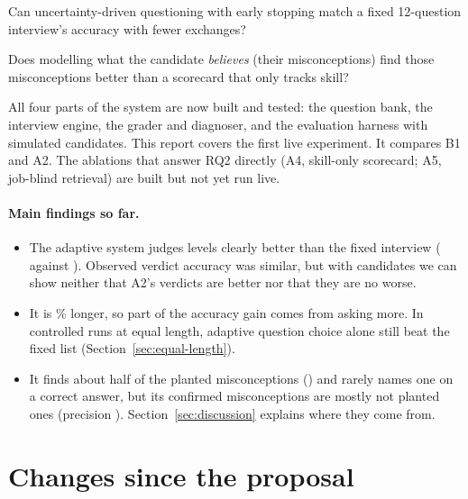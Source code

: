 \documentclass[11pt,a4paper]{article}
\begin{document}
\begin{description}[leftmargin=1.2cm,style=nextline]
  \item[RQ1] Can uncertainty-driven questioning with early stopping match a fixed 12-question
  interview's accuracy with fewer exchanges?
  \item[RQ2] Does modelling what the candidate \emph{believes} (their misconceptions) find those
  misconceptions better than a scorecard that only tracks skill?
\end{description}

All four parts of the system are now built and tested: the question bank, the interview engine,
the grader and diagnoser, and the evaluation harness with simulated candidates. This report covers
the first live experiment. It compares B1 and A2. The ablations that answer RQ2 directly
(A4, skill-only scorecard; A5, job-blind retrieval) are built but not yet run live.

\paragraph{Main findings so far.}
\begin{itemize}
  \item The adaptive system judges levels clearly better than the fixed interview
  (\accOurs{} against \accBase{}). Observed verdict accuracy was similar, but with \nCandidates{}
  candidates we can show neither that A2's verdicts are better nor that they are no worse.
  \item It is \lengthChange\% longer, so part of the accuracy gain comes from asking more. In
  controlled runs at equal length, adaptive question choice alone still beat the fixed list
  (Section~\ref{sec:equal-length}).
  \item It finds about half of the planted misconceptions (\recallOurs{}) and rarely names one on a
  correct answer, but its confirmed misconceptions are mostly not planted ones (precision
  \precisionOurs{}). Section~\ref{sec:discussion} explains where they come from.
\end{itemize}

\section{Changes since the proposal}
\end{document}
